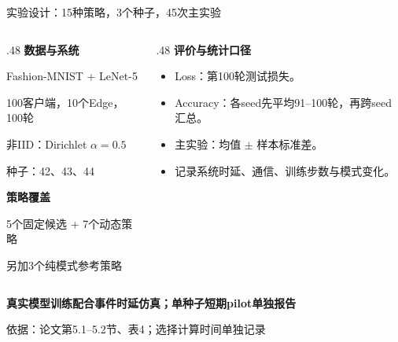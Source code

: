 \documentclass[aspectratio=169,11pt]{beamer}
\newcommand{\key}[1]{{\color{Teal}\bfseries #1}}
\newcommand{\src}[1]{\vfill{\color{Gray}\fontsize{7.5}{9}\selectfont 依据：#1\par}}
\newcommand{\msg}[1]{\par\vspace{.14cm}{\color{Teal}\rule{.32cm}{1.5pt}}\hspace{.18cm}\textbf{#1}\par}
\newcommand{\tight}{\setlength{\itemsep}{.18cm}}
\begin{document}
\begin{frame}{实验设计：15种策略，3个种子，45次主实验}
\begin{columns}[T,onlytextwidth]
\begin{column}{.48\textwidth}
\key{数据与系统}\par\vspace{.18cm}
Fashion-MNIST + LeNet-5\par
100客户端，10个Edge，100轮\par
非IID：Dirichlet $\alpha=0.5$\par
种子：42、43、44
\par\vspace{.3cm}
\key{策略覆盖}\par\vspace{.12cm}
5个固定候选 + 7个动态策略\par
另加3个纯模式参考策略
\end{column}
\begin{column}{.48\textwidth}
\key{评价与统计口径}
\begin{itemize}\tight
\item Loss：第100轮测试损失。
\item Accuracy：各seed先平均91--100轮，再跨seed汇总。
\item 主实验：均值 $\pm$ 样本标准差。
\item 记录系统时延、通信、训练步数与模式变化。
\end{itemize}
\end{column}
\end{columns}
\msg{真实模型训练配合事件时延仿真；单种子短期pilot单独报告}
\src{论文第5.1--5.2节、表4；选择计算时间单独记录}
\end{frame}
\end{document}
